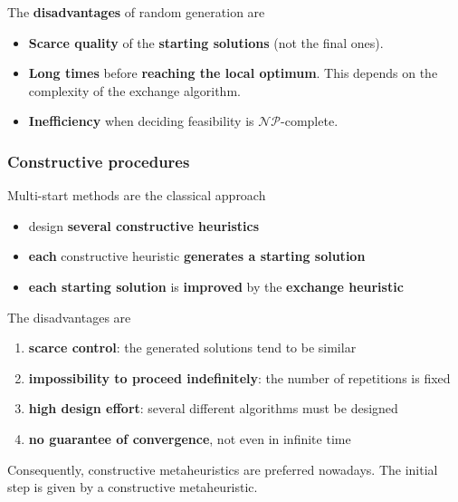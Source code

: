\documentclass[11pt]{article}
\begin{document}
	
	The \textbf{disadvantages} of random generation are
	\begin{itemize}
		\item \textbf{Scarce quality} of the \textbf{starting solutions} (not the final ones).\\
		
		\item \textbf{Long times} before \textbf{reaching the local optimum}. This depends on the complexity of the exchange algorithm.\\
		
		\item \textbf{Inefficiency} when deciding feasibility is $\mathcal{NP}$-complete.\\
	\end{itemize}
	
	\newpage
	
	\subsubsection{Constructive procedures}
	
	Multi-start methods are the classical approach
	\begin{itemize}
		\item design \textbf{several constructive heuristics}
		\item \textbf{each} constructive heuristic \textbf{generates a starting solution}
		\item \textbf{each starting solution} is \textbf{improved} by the \textbf{exchange heuristic}
	\end{itemize}
	
	\nn
	
	The disadvantages are
	\begin{enumerate}
		\item \textbf{scarce control}: the generated solutions tend to be similar
		
		\item \textbf{impossibility to proceed indefinitely}: the number of repetitions is fixed
		
		\item \textbf{high design effort}: several different algorithms must be designed
		
		\item \textbf{no guarantee of convergence}, not even in infinite time
	\end{enumerate}
	
	Consequently, constructive metaheuristics are preferred nowadays. The initial step is given by a constructive metaheuristic. \\
	
\end{document}
